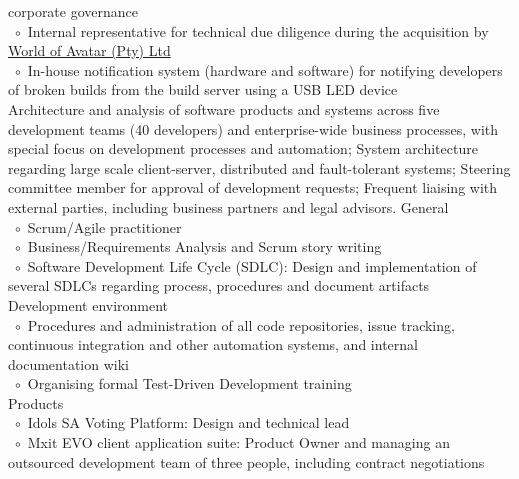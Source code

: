 \documentclass[10pt,a4paper,final]{columncv}
\newcommand{\cvitembullet}{~$\circ$~}
\newcommand{\cvitempbullet}{\phantom{\cvitembullet}}
\begin{document}
\begin{cvenv}
{         \cvitempbullet corporate governance \\
         \cvitembullet Internal representative for technical due diligence during the 
         \cvitempbullet acquisition by \href{http://www.worldofavatar.com/}{World of Avatar (Pty) Ltd} \\
         \cvitembullet In-house notification system (hardware and software) for notifying 
         \cvitempbullet developers of broken builds from the build server using a USB
         \cvitempbullet LED device
         \\}
         {Architecture and analysis of software products and systems across five 
          development teams (40 developers) and enterprise-wide business processes, with 
          special focus on development processes and automation; System architecture 
          regarding large scale client-server, distributed and fault-tolerant systems; 
          Steering committee member for approval of development requests; Frequent 
          liaising with external parties, including business partners and legal advisors.}
         {General \\
          \cvitembullet Scrum/Agile practitioner \\
          \cvitembullet Business/Requirements Analysis and Scrum story writing \\
          \cvitembullet Software Development Life Cycle (SDLC): Design and 
          \cvitempbullet implementation of several SDLCs regarding process, procedures 
          \cvitempbullet and document artifacts \\
          Development environment \\
          \cvitembullet Procedures and administration of all code repositories, issue 
          \cvitempbullet tracking, continuous integration and other automation systems, 
          \cvitempbullet and internal documentation wiki \\
          \cvitembullet Organising formal Test-Driven Development training \\
          Products \\
	  \cvitembullet Idols SA Voting Platform: Design and technical lead \\
          \cvitembullet Mxit EVO client application suite: Product Owner and managing 
          \cvitempbullet an outsourced development team of three people, including 
          \cvitempbullet contract negotiations \\
}
\end{cvenv}
\end{document}
